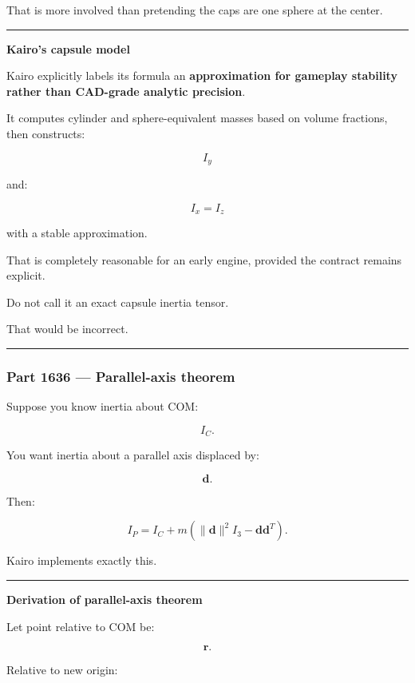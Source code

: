 That is more involved than pretending the caps are one sphere at the center.

\begin{center}\rule{0.5\linewidth}{0.5pt}\end{center}

\textbf{Kairo's capsule model}

Kairo explicitly labels its formula an \textbf{approximation for gameplay stability rather than CAD-grade analytic precision}.

It computes cylinder and sphere-equivalent masses based on volume fractions, then constructs:

\[
I_y
\]

and:

\[
I_x=I_z
\]

with a stable approximation.

That is completely reasonable for an early engine, provided the contract remains explicit.

Do not call it an exact capsule inertia tensor.

That would be incorrect.

\begin{center}\rule{0.5\linewidth}{0.5pt}\end{center}

\subsubsection{Part 1636 --- Parallel-axis theorem}\label{part-1636-parallel-axis-theorem}

Suppose you know inertia about COM:

\[
I_C.
\]

You want inertia about a parallel axis displaced by:

\[
\mathbf{d}.
\]

Then:

\[
\boxed{
I_P
=
I_C
+
m
\left(
\|\mathbf{d}\|^2I_3
-
\mathbf{d}\mathbf{d}^T
\right).
}
\]

Kairo implements exactly this.

\begin{center}\rule{0.5\linewidth}{0.5pt}\end{center}

\textbf{Derivation of parallel-axis theorem}

Let point relative to COM be:

\[
\mathbf{r}.
\]

Relative to new origin:

